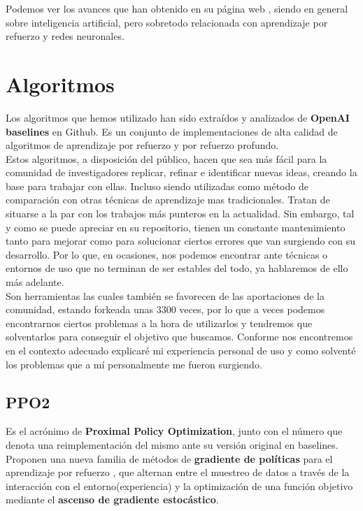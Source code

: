 \documentclass[11pt,fleqn]{book} %
\begin{document}
Podemos ver los avances que han obtenido en su página web \cite{article:openAI2}, siendo en general sobre inteligencia artificial, pero sobretodo relacionada con aprendizaje por refuerzo y redes neuronales.

\section{Algoritmos}\label{sec:Algoritmos}

Los algoritmos que hemos utilizado han sido extraídos y analizados de \textbf{OpenAI baselines} en Github. Es un conjunto de implementaciones de alta calidad de algoritmos de aprendizaje por refuerzo y por refuerzo profundo. \cite{article:baselines} \\

Estos algoritmos, a disposición del público, hacen que sea más fácil para la comunidad de investigadores replicar, refinar e identificar nuevas ideas, creando la base para trabajar con ellas. Incluso siendo utilizadas como método de comparación con otras técnicas de aprendizaje mas tradicionales. Tratan de situarse a la par con los trabajos más punteros en la actualidad. Sin embargo, tal y como se puede apreciar en su repositorio, tienen un constante mantenimiento tanto para mejorar como para solucionar ciertos errores que van surgiendo con su desarrollo. Por lo que, en ocasiones, nos podemos encontrar ante técnicas o entornos de uso que no terminan de ser estables del todo, ya hablaremos de ello más adelante. \\

Son herramientas las cuales también se favorecen de las aportaciones de la comunidad, estando forkeada unas 3300 veces, por lo que a veces podemos encontrarnos ciertos problemas a la hora de utilizarlos y tendremos que solventarlos para conseguir el objetivo que buscamos. Conforme nos encontremos en el contexto adecuado explicaré mi experiencia personal de uso y como solventé los problemas que a mí personalmente me fueron surgiendo.

\subsection{PPO2}\label{sec:PPO2}

Es el acrónimo de \textbf{Proximal Policy Optimization}, junto con el número que denota una reimplementación del mismo ante su versión original en baselines. \\

Proponen una nueva familia de métodos de \textbf{gradiente de políticas} para el aprendizaje por refuerzo , que alternan entre el muestreo de datos a través de la interacción con el entorno(experiencia) y la optimización de una función objetivo mediante el \textbf{ascenso de gradiente estocástico}. \\
\end{document}
